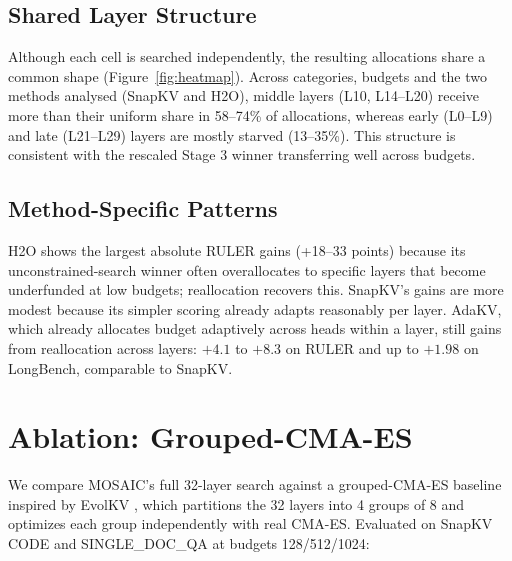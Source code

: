 \documentclass[11pt]{article}
\begin{document}
\subsection{Shared Layer Structure}

Although each cell is searched independently, the resulting allocations share a common shape (Figure~\ref{fig:heatmap}). Across categories, budgets and the two methods analysed (SnapKV and H2O), middle layers (L10, L14--L20) receive more than their uniform share in 58--74\% of allocations, whereas early (L0--L9) and late (L21--L29) layers are mostly starved (13--35\%). This structure is consistent with the rescaled Stage 3 winner transferring well across budgets.

\subsection{Method-Specific Patterns}

H2O shows the largest absolute RULER gains (+18–33 points) because its unconstrained-search winner often overallocates to specific layers that become underfunded at low budgets; reallocation recovers this. SnapKV's gains are more modest because its simpler scoring already adapts reasonably per layer. AdaKV, which already allocates budget adaptively across heads within a layer, still gains from reallocation across layers: $+4.1$ to $+8.3$ on RULER and up to $+1.98$ on LongBench, comparable to SnapKV.

\section{Ablation: Grouped-CMA-ES}

We compare MOSAIC's full 32-layer search against a grouped-CMA-ES baseline inspired by EvolKV \citep{yu2025evolkv}, which partitions the 32 layers into 4 groups of 8 and optimizes each group independently with real CMA-ES. Evaluated on SnapKV CODE and SINGLE\_DOC\_QA at budgets 128/512/1024:
\end{document}
